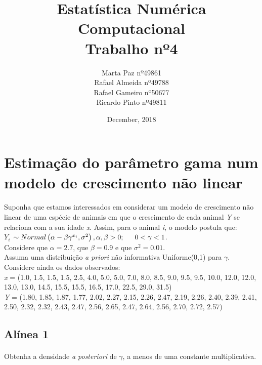 \documentclass{article}
\title{Estatística Numérica Computacional\\Trabalho nº4}
\author{Marta Paz nº49861\\
		Rafael Almeida nº49788\\
		Rafael Gameiro nº50677\\
		Ricardo Pinto nº49811\\
}
\date{December, 2018}
\begin{document}
	\maketitle
	\newpage
	
	
	\section*{Estimação do parâmetro gama num modelo de crescimento não linear}
		\paragraph{}
			Suponha que estamos interessados em considerar um modelo de crescimento não linear de uma espécie de animais em que o crescimento de cada animal \textit{Y} se relaciona com a sua idade \textit{x}. Assim, para o animal \textit{i}, o modelo postula que: \\

			\textit{$Y_i$} $\sim Normal \left(\alpha - \beta \gamma^{x_i} , \sigma^2 \right), \alpha, \beta > 0; \indent 0 < \gamma < 1$.\\
			
			Considere que $\alpha = 2.7$, que $\beta = 0.9$ e que $\sigma^2 = 0.01$. \\
			\indent Assuma uma distribuição \textit{a priori} não informativa Uniforme(0,1) para $\gamma$. \\
			\indent Considere ainda os dados observados: \\

			\textit{x} = (1.0, 1.5, 1.5, 1.5, 2.5, 4.0, 5.0, 5.0, 7.0, 8.0, 8.5, 9.0, 9.5, 9.5, 10.0, 12.0, 12.0, 13.0, 13.0, 14.5, 15.5, 15.5, 16.5, 17.0, 22.5, 29.0, 31.5) \\

			\textit{Y} = (1.80, 1.85, 1.87, 1.77, 2.02, 2.27, 2.15, 2.26, 2.47, 2.19, 2.26, 2.40, 2.39, 2.41, 2.50, 2.32, 2.32, 2.43, 2.47, 2.56, 2.65, 2.47, 2.64, 2.56, 2.70, 2.72, 2.57) \\
			

		\subsection*{Alínea 1}
			\paragraph{}
				Obtenha a densidade \textit{a posteriori} de $\gamma$, a menos de uma constante multiplicativa. 
\end{document}
